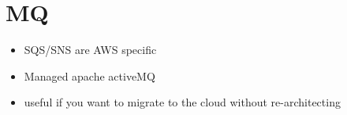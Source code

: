 \documentclass[]{scrartcl}
\begin{document}
\section{MQ}
\begin{itemize}
	\item SQS/SNS are AWS specific
	\item Managed apache activeMQ
	\item useful if you want to migrate to the cloud without re-architecting
\end{itemize}
\end{document}
